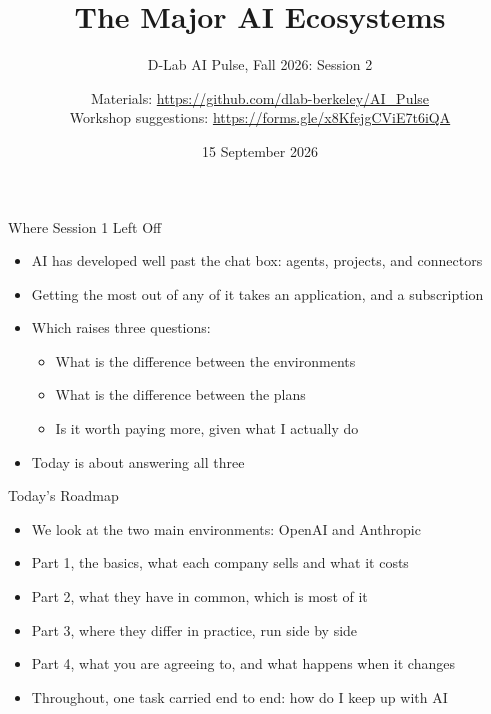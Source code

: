 \documentclass[aspectratio=169]{beamer}
\title{The Major AI Ecosystems}
\subtitle{D-Lab AI Pulse, Fall 2026: Session 2}
\author[D-Lab]{Materials: \url{https://github.com/dlab-berkeley/AI_Pulse}\\Workshop suggestions: \url{https://forms.gle/x8KfejgCViE7t6iQA}}
\date{15 September 2026}
\begin{document}
\begin{frame}
    \titlepage
\end{frame}

\begin{frame}{Where Session 1 Left Off}
    \begin{itemize}
        \item AI has developed well past the chat box: agents, projects, and connectors
        \item Getting the most out of any of it takes an application, and a subscription
        \item Which raises three questions:
            \vspace{1em}
            \begin{itemize}\setlength{\itemsep}{4pt}
                \item What is the difference between the environments
                \item What is the difference between the plans
                \item Is it worth paying more, given what I actually do
            \end{itemize}
        \item Today is about answering all three
    \end{itemize}
\end{frame}

\begin{frame}{Today's Roadmap}
    \begin{itemize}\setlength{\itemsep}{7pt}
        \item We look at the two main environments: OpenAI and Anthropic
        \item Part 1, the basics, what each company sells and what it costs
        \item Part 2, what they have in common, which is most of it
        \item Part 3, where they differ in practice, run side by side
        \item Part 4, what you are agreeing to, and what happens when it changes
        \item Throughout, one task carried end to end: how do I keep up with AI
    \end{itemize}
\end{frame}
\end{document}
